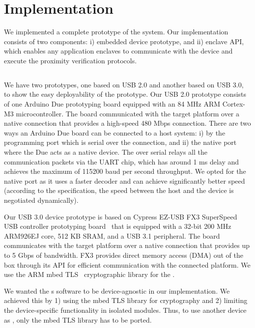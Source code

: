\section{Implementation}
\label{sec:implementation}

We implemented a complete prototype of the \name system. Our implementation consists of two components: i) \device embedded device prototype, and ii) \name enclave API, which enables any application enclaves to communicate with the \device device and execute the proximity verification protocols.

\subsection{\device}

We have two prototypes, one based on USB 2.0 and another based on USB 3.0, to show the easy deployability of the prototype. Our USB 2.0 \device prototype consists of one Arduino Due prototyping board equipped with an 84 MHz ARM Cortex-M3 microcontroller. The board communicated with the target platform over a native  connection that provides a high-speed 480 Mbps connection. There are two ways an Arduino Due board can be connected to a host system: i) by the programming port which is serial over the \usb connection, and ii) the native \usb port where the Due acts as a native \usb device. The \usb over serial relays all the communication packets via the UART chip, which has around 1 ms delay and achieves the maximum of 115200 baud per second throughput. We opted for the native \usb port as it uses a faster  decoder and can achieve significantly better speed (according to the \usb specification, the speed between the host and the device is negotiated dynamically).


Our USB 3.0 device prototype is based on Cypress EZ-USB FX3 SuperSpeed USB controller prototyping board~\cite{fx3} that is equipped with a 32-bit 200 MHz ARM926EJ core, 512 KB SRAM, and a USB 3.1 peripheral. The board communicates with the target platform over a native  connection that provides up to 5 Gbps of bandwidth. FX3 provides direct memory access (DMA) out of the box through its API for efficient communication with the connected platform. We use the ARM mbed TLS~\cite{mbed} cryptographic library for the \tls.

 We wanted the \device{}s software to be device-agnostic in our implementation. We achieved this by 1) using the mbed TLS library for cryptography and 2) limiting the device-specific functionality in isolated modules. Thus, to use another device as \device, only the mbed TLS library has to be ported.

